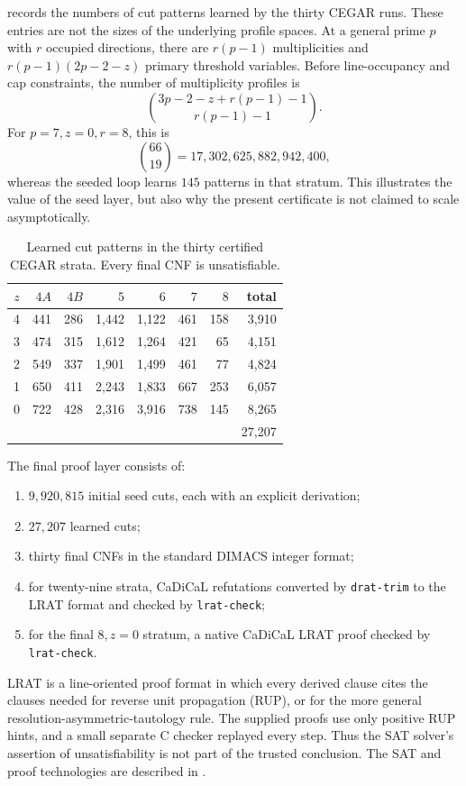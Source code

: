 \documentclass[11pt]{amsart}
\theoremstyle{definition}
\begin{document}
 records the numbers of cut patterns learned by the
thirty CEGAR runs.  These entries are not the
sizes of the underlying profile spaces.  At a general prime $p$ with
$r$ occupied directions, there are $r(p-1)$ multiplicities and
$r(p-1)(2p-2-z)$ primary threshold variables.  Before line-occupancy
and cap constraints, the number of multiplicity profiles is
\[
\binom{3p-2-z+r(p-1)-1}{r(p-1)-1}.
\]
For $p=7,z=0,r=8$, this is
\[
\binom{66}{19}=17{,}302{,}625{,}882{,}942{,}400,
\]
whereas the seeded loop learns $145$ patterns in that stratum.  This
illustrates the value of the seed layer, but also why the present
certificate is not claimed to scale asymptotically.

\begin{table}[ht]
\centering
\caption{Learned cut patterns in the thirty certified CEGAR strata. Every final CNF is unsatisfiable.}
\label{tab:cegar}
\begin{tabular}{@{}crrrrrrr@{}}
\toprule
$z$ & $4A$ & $4B$ & $5$ & $6$ & $7$ & $8$ & total\\
\midrule
4 & 441 & 286 & 1,442 & 1,122 & 461 & 158 & 3,910\\
3 & 474 & 315 & 1,612 & 1,264 & 421 &  65 & 4,151\\
2 & 549 & 337 & 1,901 & 1,499 & 461 &  77 & 4,824\\
1 & 650 & 411 & 2,243 & 1,833 & 667 & 253 & 6,057\\
0 & 722 & 428 & 2,316 & 3,916 & 738 & 145 & 8,265\\
\midrule
  &     &     &       &       &     &     & 27,207\\
\bottomrule
\end{tabular}
\end{table}

The final proof layer consists of:
\begin{enumerate}[label=(\roman*)]
\item $9{,}920{,}815$ initial seed cuts, each with an explicit derivation;
\item $27{,}207$ learned cuts;
\item thirty final CNFs in the standard DIMACS integer format;
\item for twenty-nine strata, CaDiCaL refutations converted by
      \texttt{drat-trim} to the LRAT format and checked by
      \texttt{lrat-check};
\item for the final $8,z=0$ stratum, a native CaDiCaL LRAT proof checked
      by \texttt{lrat-check}.
\end{enumerate}
LRAT is a line-oriented proof format in which every derived clause cites
the clauses needed for reverse unit propagation (RUP), or for the more
general resolution-asymmetric-tautology rule.  The supplied proofs use
only positive RUP hints, and a small separate C checker replayed every
step.  Thus the SAT solver's assertion of unsatisfiability is not part
of the trusted conclusion.  The SAT and proof technologies are
described in \cite{PySAT2018,CaDiCaL2024,LRAT2017}.
\end{document}

